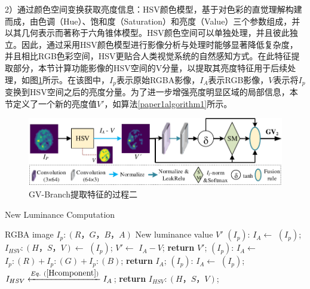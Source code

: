 2）通过颜色空间变换获取亮度信息：HSV颜色模型，基于对色彩的直觉理解构建而成，由色调（Hue）、饱和度（Saturation）和亮度（Value）三个参数组成，并以其几何表示而著称于六角锥体模型。HSV颜色空间可以单独处理，并且彼此独立。因此，通过采用HSV颜色模型进行影像分析与处理时能够显著降低复杂度，并且相比RGB色彩空间，HSV更贴合人类视觉系统的自然感知方式。在此特征提取部分，本节计算功能影像的HSV空间的V分量，以提取其亮度特征用于后续处理，如图\ref{paper1FO2_hsV}所示。在该图中，$I_p$表示原始RGBA影像，$I_A$表示RGB影像，$V$表示将$I_p$变换到HSV空间之后的亮度分量。为了进一步增强亮度明显区域的局部信息，本节定义了一个新的亮度值$V'$，如算法\ref{paper1algorithm1}所示。 
   \begin{figure}[htbp]
      \centering
          \includegraphics[width=0.9\columnwidth]{figs/paper1FO2_hsV.pdf}
          \caption{GV-Branch提取特征的过程二}\label{paper1FO2_hsV}
     \end{figure}


    \begin{algorithm}[ht]
    \caption{New Luminance Computation}\label{paper1algorithm1}
    \centering
    \begin{algorithmic}[1]
    \Require RGBA image $I_p: (R， G， B， A)$
    \Ensure New luminance value $V'$
     $(I_p)$:
    \State \hspace{0.5cm}$I_{A} \gets$  $(I_p)$;
    \State \hspace{0.5cm}$I_{HSV}: (H， S， V) \gets$  $(I_p)$;
    \State \hspace{0.5cm}$V' \gets$ $I_{A} - V$;
    \State \hspace{0.5cm}\textbf{return} $V'$;
     $(I_p)$:
    \State \hspace{0.5cm}$I_{A} \gets$ $I_p:(R) + I_p:(G) + I_p:(B)$;
    \State \hspace{0.5cm}\textbf{return} $I_{A}$;
     $(I_p)$:
    \State \hspace{0.5cm}$I_{A} \gets$  $(I_p)$;
    \State \hspace{0.5cm}$I_{HSV} \xleftarrow{Eq.~(\ref{Hcomponent})} I_{A}$;
    \State \hspace{0.5cm}\textbf{return} $I_{HSV}: (H， S， V)$;
    \end{algorithmic}
    \end{algorithm}

